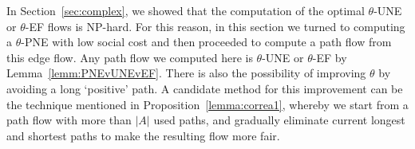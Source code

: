 \begin{remark}
In Section~\ref{sec:complex}, we showed that the computation of the optimal $\theta$-UNE or $\theta$-EF flows is NP-hard. %
For this reason, in this section we turned to computing a $\theta$-PNE with low social cost and then proceeded to compute a path flow from this edge flow. Any path flow we computed here is $\theta$-UNE or $\theta$-EF by Lemma~\ref{lemm:PNEvUNEvEF}. There is also the possibility of improving $\theta$ by avoiding a long `positive' path. A candidate method for this improvement can be the technique mentioned in Proposition~\ref{lemma:correa1}, whereby we start from a path flow with more than $|A|$ used paths, and gradually eliminate current longest and shortest paths to make the resulting flow more fair.  
\end{remark}


